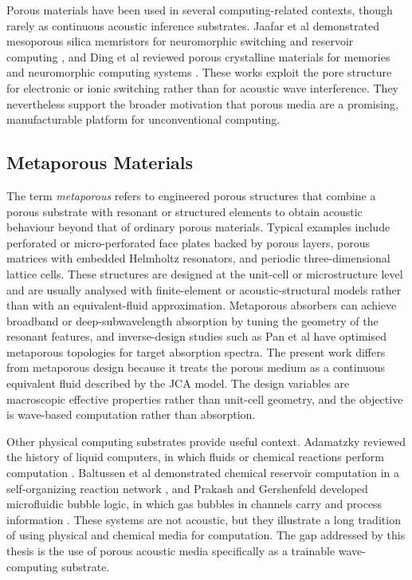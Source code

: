 Porous materials have been used in several computing-related contexts, though rarely as continuous acoustic inference substrates. Jaafar et al demonstrated mesoporous silica memristors for neuromorphic switching and reservoir computing \cite{jaafar2022mesoporous}, and Ding et al reviewed porous crystalline materials for memories and neuromorphic computing systems \cite{ding2023porous}. These works exploit the pore structure for electronic or ionic switching rather than for acoustic wave interference. They nevertheless support the broader motivation that porous media are a promising, manufacturable platform for unconventional computing.

\subsection{Metaporous Materials}

The term \emph{metaporous} refers to engineered porous structures that combine a porous substrate with resonant or structured elements to obtain acoustic behaviour beyond that of ordinary porous materials. Typical examples include perforated or micro-perforated face plates backed by porous layers, porous matrices with embedded Helmholtz resonators, and periodic three-dimensional lattice cells. These structures are designed at the unit-cell or microstructure level and are usually analysed with finite-element or acoustic-structural models rather than with an equivalent-fluid approximation. Metaporous absorbers can achieve broadband or deep-subwavelength absorption by tuning the geometry of the resonant features, and inverse-design studies such as Pan et al have optimised metaporous topologies for target absorption spectra. The present work differs from metaporous design because it treats the porous medium as a continuous equivalent fluid described by the JCA model. The design variables are macroscopic effective properties rather than unit-cell geometry, and the objective is wave-based computation rather than absorption.

Other physical computing substrates provide useful context. Adamatzky reviewed the history of liquid computers, in which fluids or chemical reactions perform computation \cite{adamatzky2019liquid}. Baltussen et al demonstrated chemical reservoir computation in a self-organizing reaction network \cite{baltussen2024chemical}, and Prakash and Gershenfeld developed microfluidic bubble logic, in which gas bubbles in channels carry and process information \cite{prakash2007bubble}. These systems are not acoustic, but they illustrate a long tradition of using physical and chemical media for computation. The gap addressed by this thesis is the use of porous acoustic media specifically as a trainable wave-computing substrate.

